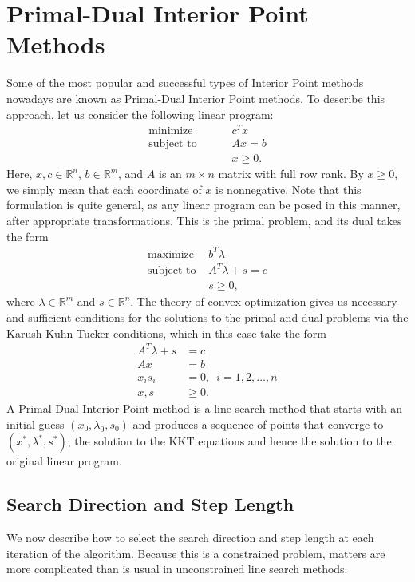 \section*{Primal-Dual Interior Point Methods}
Some of the most popular and successful types of Interior Point methods nowadays are known as Primal-Dual Interior Point methods. To
describe this approach, let us consider the following linear program:
\begin{align*}
\text{minimize }\qquad &c^Tx\\
\text{subject to }\qquad &Ax = b\\
&x \geq 0.
\end{align*}
Here, $x, c \in \mathbb{R}^n$, $b \in \mathbb{R}^m$, and $A$ is an $m \times n$ matrix with full row rank. By $x \geq 0$, we
simply mean that each coordinate of $x$ is nonnegative. Note that this formulation is quite general, as any linear program can be
posed in this manner, after appropriate transformations. This is the primal problem, and its dual takes the form
\begin{align*}
\text{maximize } &b^T\lambda\\
\text{subject to } &A^T\lambda + s = c\\
&s \geq 0,
\end{align*}
where $\lambda \in \mathbb{R}^m$ and $s \in \mathbb{R}^n$. The theory of convex optimization gives us necessary and sufficient
conditions for the solutions to the primal and dual problems via the Karush-Kuhn-Tucker conditions, which in this case take the form
\begin{align*}
A^T\lambda + s &= c\\
Ax &= b\\
x_is_i &= 0, \,\,\, i = 1,2,\ldots,n\\
x, s &\geq 0.
\end{align*}
A Primal-Dual Interior Point method is a line search method that starts with an initial guess $(x_0, \lambda_0, s_0)$
and produces a sequence of points that converge to $(x^*, \lambda^*, s^*)$, the solution to the KKT equations and hence
the solution to the original linear program.

\subsection*{Search Direction and Step Length}
We now describe how to select the search direction and step length at each iteration of the algorithm. Because this is
a constrained problem, matters are more complicated than is usual in unconstrained line search methods.

